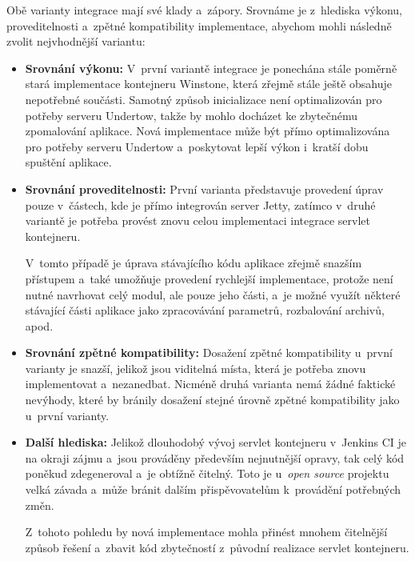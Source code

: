             \noindent Obě varianty integrace mají své klady a~zápory. 
            Srovnáme je z~hlediska výkonu, proveditelnosti a~zpětné kompatibility
            implementace, abychom mohli následně zvolit nejvhodnější variantu:

            \begin{itemize}
                \item{\textbf{Srovnání výkonu:} V~první variantě integrace je ponechána stále
                 poměrně stará implementace kontejneru Winstone, která zřejmě stále ještě
                 obsahuje nepotřebné součásti. Samotný způsob inicializace není optimalizován
                 pro potřeby serveru Undertow, takže by mohlo docházet ke zbytečnému
                 zpomalování aplikace.
                 Nová implementace může být přímo optimalizována pro potřeby 
                 serveru Undertow a~poskytovat lepší výkon i~kratší dobu spuštění aplikace.}

                \item{\textbf{Srovnání proveditelnosti:} První varianta představuje provedení 
                    úprav pouze v~částech, kde je přímo integrován server Jetty, 
                    zatímco v~druhé variantě je potřeba provést znovu celou implementaci
                    integrace servlet kontejneru. 
                                         
                    V~tomto případě je úprava stávajícího kódu aplikace
                    zřejmě snazším přístupem a~také umožňuje provedení rychlejší
                    implementace, protože není nutné navrhovat celý modul,
                    ale pouze jeho části, a~je možné využít některé stávající části aplikace
                    jako zpracovávání parametrů, rozbalování archivů, apod.}

                \item{\textbf{Srovnání zpětné kompatibility:} Dosažení zpětné kompatibility
                    u~první varianty je snazší, jelikož jsou viditelná místa, která je 
                    potřeba znovu implementovat a~nezanedbat. Nicméně druhá varianta
                    nemá žádné faktické nevýhody, které by bránily dosažení 
                    stejné úrovně zpětné kompatibility jako u~první varianty.}

                \item{\textbf{Další hlediska:} Jelikož dlouhodobý vývoj servlet kontejneru
                    v~Jenkins CI je na okraji zájmu a~jsou prováděny především nejnutnější opravy, 
                    tak celý kód poněkud zdegeneroval a~je obtížně čitelný. Toto
                    je u~\emph{open source} projektu velká závada 
                    a~může bránit dalším přispěvovatelům k~provádění potřebných změn.

                    Z~tohoto pohledu by nová implementace mohla přinést mnohem čitelnější
                    způsob řešení a~zbavit kód zbytečností z~původní realizace servlet kontejneru.}
            \end{itemize}



